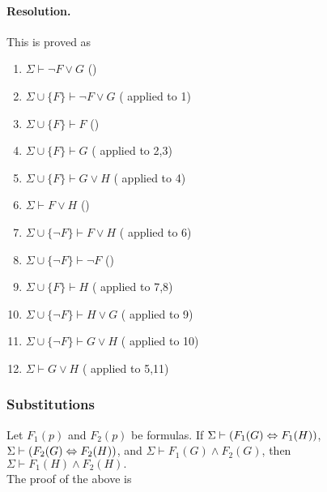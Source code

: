 \paragraph{Resolution.} %
\begin{prooftree}
\end{prooftree}
This is proved as
\begin{enumerate}
    \item $\Sigma\vdash \neg F\lor G$ \hfill ()
    \item $\Sigma\cup\{F\}\vdash \neg F\lor G$ \hfill ( applied to 1)
    \item $\Sigma\cup\{F\}\vdash F$ \hfill ()
    \item $\Sigma\cup\{F\}\vdash G$ \hfill ( applied to 2,3)
    \item $\Sigma\cup\{F\}\vdash G\lor H$ \hfill ( applied to 4)
    \item $\Sigma\vdash F\lor H$ \hfill ()
    \item $\Sigma\cup\{\neg F\}\vdash F\lor H$ \hfill ( applied to 6)
    \item $\Sigma\cup\{\neg F\}\vdash \neg F$ \hfill ()
    \item $\Sigma\cup\{F\}\vdash H$ \hfill ( applied to 7,8)
    \item $\Sigma\cup\{\neg F\}\vdash H\lor G$ \hfill ( applied to 9)
    \item $\Sigma\cup\{\neg F\}\vdash G\lor H$ \hfill ( applied to 10)
    \item $\Sigma\vdash G\lor H$ \hfill ( applied to 5,11)
\end{enumerate}

\subsubsection{Substitutions}

 Let $F_1(p)$ and $F_2(p)$ be formulas. If $\Sigma\vdash (F_1(G)\siff F_1(H))$, $\Sigma\vdash(F_2(G)\siff F_2(H))$, and $\Sigma\vdash F_1(G)\land F_2(G)$, then $\Sigma\vdash F_1(H)\land F_2(H).$\\
 The proof of the above is

